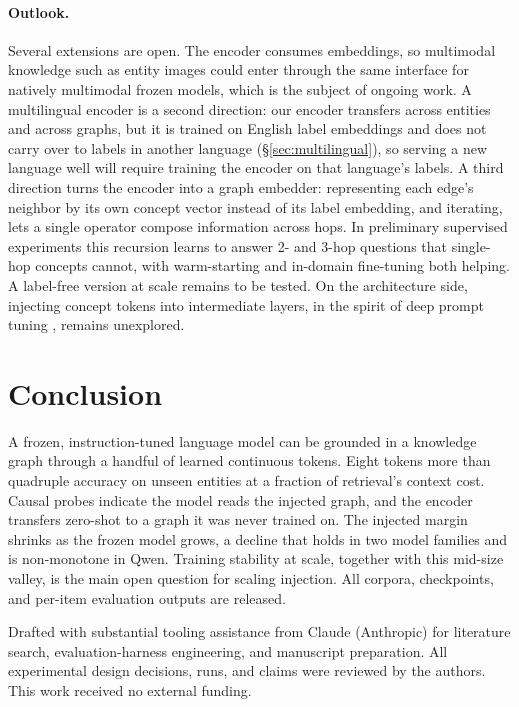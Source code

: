 \documentclass{article}
\begin{document}
\paragraph{Outlook.} Several extensions are open. The encoder consumes embeddings,
so multimodal knowledge such as entity images could enter through the same interface for
natively multimodal frozen models, which is the subject of ongoing work. A multilingual
encoder is a second direction: our encoder transfers across entities and across graphs,
but it is trained on English label embeddings and does not carry over to labels in another
language (\S\ref{sec:multilingual}), so serving a new language well will require training the
encoder on that language's labels. A third direction turns the
encoder into a graph embedder: representing each edge's neighbor by its own concept vector
instead of its label embedding, and iterating, lets a single operator compose information
across hops. In preliminary supervised experiments this recursion learns to answer 2- and
3-hop questions that single-hop concepts cannot, with warm-starting and in-domain fine-tuning
both helping. A label-free version at scale remains to be tested. On the architecture side,
injecting concept tokens into intermediate layers, in the spirit of deep prompt tuning
\citep{ptuningv2}, remains unexplored.

\section{Conclusion}

A frozen, instruction-tuned language model can be grounded in a knowledge graph through a
handful of learned continuous tokens. Eight tokens more than quadruple accuracy on unseen
entities at a fraction of retrieval's context cost. Causal probes indicate the model reads
the injected graph, and the encoder transfers zero-shot to a graph it was never trained on.
The injected margin shrinks as the frozen model grows, a decline that holds in two model
families and is non-monotone in Qwen. Training stability at scale, together with this mid-size
valley, is the main open question for scaling injection. All corpora,
checkpoints, and per-item evaluation outputs are released.

\begin{ack}
Drafted with substantial tooling assistance from Claude (Anthropic) for literature search,
evaluation-harness engineering, and manuscript preparation. All experimental design
decisions, runs, and claims were reviewed by the authors. This work received no external
funding.
\end{ack}
\end{document}
